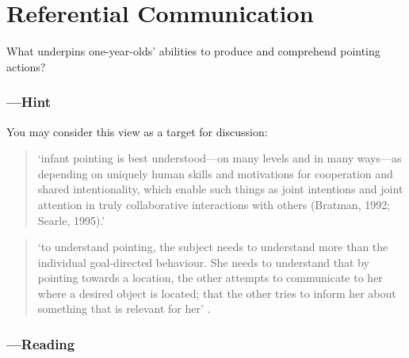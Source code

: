 \documentclass[12pt,\papersize]{extarticle}
\begin{document}




\clearpage



\section{Referential Communication}

What underpins one-year-olds’ abilities to produce and comprehend pointing actions?



\subsubsection{---Hint}

You may consider this view as a target for discussion:

\begin{quote}
‘infant pointing is best understood---on many levels and in many ways---as depending on uniquely human skills and motivations for cooperation and shared intentionality, which enable such things as joint intentions and joint attention in truly collaborative interactions with others (Bratman, 1992; Searle, 1995).’  \citep[p.~706]{Tomasello:2007fi}
\end{quote}


\begin{quote}
‘to understand pointing, the subject needs to understand more than the individual goal-directed behaviour. She needs to understand that by pointing towards a location, the other attempts to communicate to her where a desired object is located; that the other tries to inform her about something that is relevant for her’
\citep[p.\ 6]{Moll:2007gu}.
\end{quote}



\subsubsection{---Reading}




\end{document}
